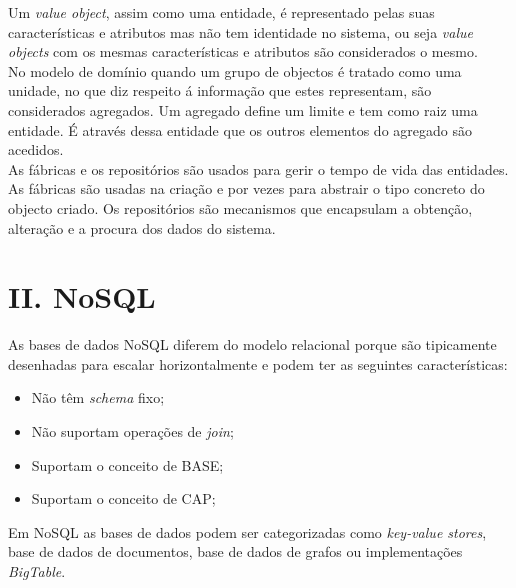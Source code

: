 \documentclass[]{article}
\begin{document}
Um \emph{value object}, assim como uma entidade, é representado pelas suas características e atributos mas não tem identidade no sistema, ou seja \emph{value objects} com os mesmas características e atributos são considerados o mesmo.\\

No modelo de domínio quando um grupo de objectos é tratado como uma unidade, no que diz respeito á informação que estes representam, são considerados agregados. Um agregado define um limite e tem como raiz uma entidade. É através dessa entidade que os outros elementos do agregado são acedidos.\\
As fábricas e os repositórios são usados para gerir o tempo de vida das entidades. As fábricas são usadas na criação e por vezes para abstrair o tipo concreto do objecto criado. Os repositórios são mecanismos que encapsulam a obtenção, alteração e a procura dos dados do sistema.\\

\newpage
\section{II. NoSQL}
\label{anexob}
As bases de dados NoSQL diferem do modelo relacional porque são tipicamente desenhadas para escalar horizontalmente e podem ter as seguintes características:
\begin{itemize}
\item
Não têm \emph{schema} fixo;
\item
Não suportam operações de \emph{join};
\item
Suportam o conceito de BASE;
\item
Suportam o conceito de CAP;
\end{itemize}
Em NoSQL as bases de dados podem ser categorizadas como \emph{key-value stores}, base de dados de documentos, base de dados de grafos ou implementações \emph{BigTable}.
\end{document}
